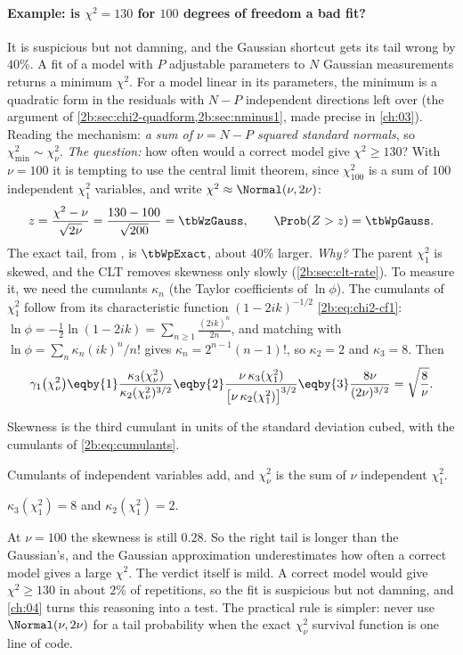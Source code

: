 \paragraph{Example: is $\chi^2=130$ for $100$ degrees of freedom a bad fit?} It is suspicious but not damning, and the Gaussian shortcut gets its tail wrong by $40\%$. A fit of a model with $P$ adjustable parameters to $N$ Gaussian measurements returns a minimum $\chi^2$. For a model linear in its parameters, the minimum is a quadratic form in the residuals with $N-P$ independent directions left over (the argument of \cref{2b:sec:chi2-quadform,2b:sec:nminus1}, made precise in \cref{ch:03}). Reading the mechanism: \emph{a sum of $\nu=N-P$ squared standard normals}, so $\chi^2_{\min}\sim\chi^2_\nu$. \emph{The question:} how often would a correct model give $\chi^2\ge130$? With $\nu=100$ it is tempting to use the central limit theorem, since $\chi^2_{100}$ is a sum of $100$ independent $\chi^2_1$ variables, and write $\chi^2\approx\Normal(\nu,2\nu)$:
\[
  z=\frac{\chi^2-\nu}{\sqrt{2\nu}}=\frac{130-100}{\sqrt{200}}=\tbWzGauss ,\qquad \Prob(Z>z)=\tbWpGauss .
\]
The exact tail, from , is $\tbWpExact$, about $40\%$ larger. \emph{Why?} The parent $\chi^2_1$ is skewed, and the CLT removes skewness only slowly (\cref{2b:sec:clt-rate}). To measure it, we need the cumulants $\kappa_n$ (the Taylor coefficients of $\ln\phi$). The cumulants of $\chi^2_1$ follow from its characteristic function $(1-2ik)^{-1/2}$ \eqref{2b:eq:chi2-cf1}: $\ln\phi=-\frac12\ln(1-2ik)=\sum_{n\ge1}\frac{(2ik)^n}{2n}$, and matching with $\ln\phi=\sum_n\kappa_n(ik)^n/n!$ gives $\kappa_n=2^{n-1}(n-1)!$, so $\kappa_2=2$ and $\kappa_3=8$. Then
\begin{align}
  \gamma_1\bigl(\chi^2_\nu\bigr)
  \eqby{1}\frac{\kappa_3(\chi^2_\nu)}{\kappa_2(\chi^2_\nu)^{3/2}}
  \eqby{2}\frac{\nu\,\kappa_3(\chi^2_1)}{\bigl[\nu\,\kappa_2(\chi^2_1)\bigr]^{3/2}}
  \eqby{3}\frac{8\nu}{(2\nu)^{3/2}}
  =\sqrt{\frac8\nu} .
  \label{2b:eq:chi2-skew}
\end{align}
\begin{explain}
  \item Skewness is the third cumulant in units of the standard deviation cubed, with the cumulants of \eqref{2b:eq:cumulants}.
  \item Cumulants of independent variables add, and $\chi^2_\nu$ is the sum of $\nu$ independent $\chi^2_1$.
  \item $\kappa_3(\chi^2_1)=8$ and $\kappa_2(\chi^2_1)=2$.
\end{explain}
At $\nu=100$ the skewness is still $0.28$. So the right tail is longer than the Gaussian's, and the Gaussian approximation underestimates how often a correct model gives a large $\chi^2$. The verdict itself is mild. A correct model would give $\chi^2\ge130$ in about $2\%$ of repetitions, so the fit is suspicious but not damning, and \cref{ch:04} turns this reasoning into a test. The practical rule is simpler: never use $\Normal(\nu,2\nu)$ for a tail probability when the exact $\chi^2_\nu$ survival function is one line of code.

